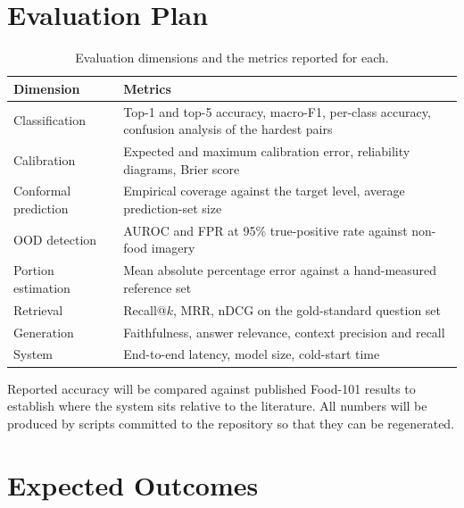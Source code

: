 \documentclass[12pt,a4paper,oneside]{report}
\begin{document}
\chapter{Evaluation Plan}

\begin{table}[h]
\centering
\begin{tabular}{p{4.2cm}p{9.2cm}}
\toprule
\textbf{Dimension} & \textbf{Metrics} \\
\midrule
Classification & Top-1 and top-5 accuracy, macro-F1, per-class accuracy,
confusion analysis of the hardest pairs \\
Calibration & Expected and maximum calibration error, reliability diagrams,
Brier score \\
Conformal prediction & Empirical coverage against the target level, average
prediction-set size \\
OOD detection & AUROC and FPR at 95\% true-positive rate against non-food
imagery \\
Portion estimation & Mean absolute percentage error against a hand-measured
reference set \\
Retrieval & Recall@$k$, MRR, nDCG on the gold-standard question set \\
Generation & Faithfulness, answer relevance, context precision and recall \\
System & End-to-end latency, model size, cold-start time \\
\bottomrule
\end{tabular}
\caption{Evaluation dimensions and the metrics reported for each.}
\end{table}

Reported accuracy will be compared against published Food-101 results to
establish where the system sits relative to the literature. All numbers will be
produced by scripts committed to the repository so that they can be regenerated.

\chapter{Expected Outcomes}
\end{document}
